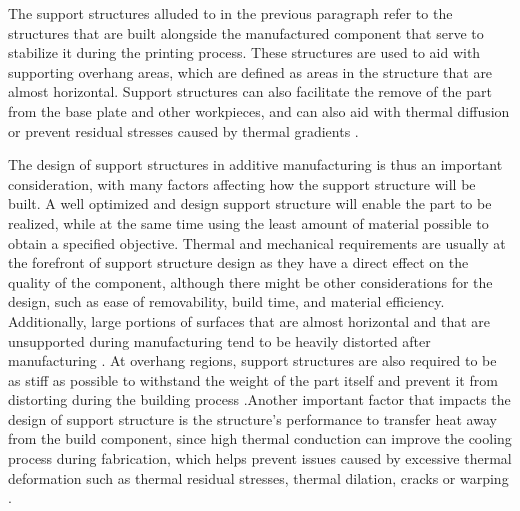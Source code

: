 \documentclass[../main.tex]{subfiles}
\begin{document}
The support structures alluded to in the previous paragraph refer to the structures that are built alongside the manufactured component that serve to stabilize it during the printing process. These structures are used to aid with supporting overhang areas, which are defined as areas in the structure that are almost horizontal. Support structures can also facilitate the remove of the part from the base plate and other workpieces, and can also aid with thermal diffusion or prevent residual stresses caused by thermal gradients \cite{chungpei-hsuStudyLatticeSupport2024}. 

The design of support structures in additive manufacturing is thus an important consideration, with many factors affecting how the support structure will be built. A well optimized and design support structure will enable the part to be realized, while at the same time using the least amount of material possible to obtain a specified objective. Thermal and mechanical requirements are usually at the forefront of support structure design as they have a direct effect on the quality of the component, although there might be other considerations for the design, such as ease of removability, build time, and material efficiency. Additionally, large portions of surfaces that are almost horizontal and that are unsupported during manufacturing tend to be heavily distorted after manufacturing \cite{allaireOptimizingSupportsAdditive2018}. At overhang regions, support structures are also required to be as stiff as possible to withstand the weight of the part itself and prevent it from distorting during the building process \cite{kuoSupportStructureDesign2018} \cite{kumarTailoredSupportStructures2020}.Another important factor that impacts the design of support structure is the structure's performance to transfer heat away from the build component, since high thermal conduction can improve the cooling process during fabrication, which helps prevent issues caused by excessive thermal deformation such as thermal residual stresses, thermal dilation, cracks or warping \cite{allaireOptimizingSupportsAdditive2018} \cite{zhouTopologyOptimizationThermal2019}.
\end{document}
